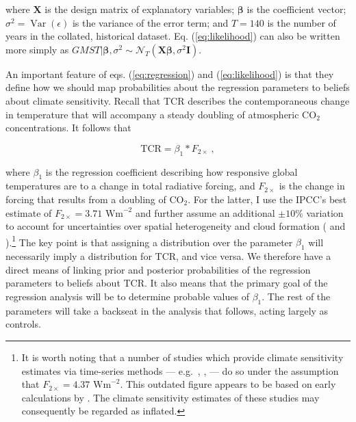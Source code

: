 \documentclass[smallextended]{svjour3}       %
\begin{document}
where \(\mathbf{X}\) is the design matrix of explanatory variables;
\(\boldsymbol{\beta}\) is the coefficient vector;
\(\sigma^2 = \mathop{\mathrm{Var}}(\epsilon)\) is the variance of the
error term; and \(T=140\) is the number of years in the collated,
historical dataset. Eq. (\ref{eq:likelihood}) can also be written more
simply as
\(GMST | \boldsymbol{\beta}, \sigma^2 \sim \mathcal{N}_T(\mathbf{X}\boldsymbol{\beta}, \sigma^2\mathbf{I})\).

An important feature of eqs. (\ref{eq:regression}) and
(\ref{eq:likelihood}) is that they define how we should map
probabilities about the regression parameters to beliefs about climate
sensitivity. Recall that TCR describes the contemporaneous change in
temperature that will accompany a steady doubling of atmospheric
CO\(_2\) concentrations. It follows that

\begin{equation}
   \text{TCR} = \beta_1 * F_{2\times}\ , \label{eq:impliedtcr}
\end{equation}

where \(\beta_1\) is the regression coefficient describing how
responsive global temperatures are to a change in total radiative
forcing, and \(F_{2\times}\) is the change in forcing that results from
a doubling of CO\(_2\). For the latter, I use the IPCC's best estimate
of \(F_{2\times}=3.71 \text{ Wm}^{-2}\) and further assume an additional
\(\pm10\%\) variation to account for uncertainties over spatial
heterogeneity and cloud formation (\cite{schmidt2007co2} and
\cite{ipcc2001i}).\footnote{It is worth noting that a number of studies
  which provide climate sensitivity estimates via time-series methods
  --- e.g.~\cite{kaufmann2006emissions}, \cite{mills2009robust},
  \cite{estrada2012breaks} --- do so under the assumption that
  \(F_{2\times}=4.37 \text{ Wm}^{-2}\). This outdated figure appears to
  be based on early calculations by \cite{hansen1988global}. The climate
  sensitivity estimates of these studies may consequently be regarded as
  inflated.} The key point is that assigning a distribution over the
parameter \(\beta_1\) will necessarily imply a distribution for TCR, and
vice versa. We therefore have a direct means of linking prior and
posterior probabilities of the regression parameters to beliefs about
TCR. It also means that the primary goal of the regression analysis will
be to determine probable values of \(\beta_1\). The rest of the
parameters will take a backseat in the analysis that follows, acting
largely as controls.
\end{document}
